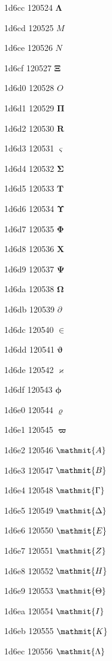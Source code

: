 \documentclass[11pt]{article}
\begin{document}
1d6cc 120524 \ensuremath{\mathbf{\Lambda}}

1d6cd 120525 \ensuremath{M}

1d6ce 120526 \ensuremath{N}

1d6cf 120527 \ensuremath{\mathbf{\Xi}}

1d6d0 120528 \ensuremath{O}

1d6d1 120529 \ensuremath{\mathbf{\Pi}}

1d6d2 120530 \ensuremath{\mathbf{{R}}}

1d6d3 120531 \ensuremath{\mathbf{\varsigma}}

1d6d4 120532 \ensuremath{\mathbf{\Sigma}}

1d6d5 120533 \ensuremath{\mathbf{{T}}}

1d6d6 120534 \ensuremath{\mathbf{\Upsilon}}

1d6d7 120535 \ensuremath{\mathbf{\Phi}}

1d6d8 120536 \ensuremath{\mathbf{{X}}}

1d6d9 120537 \ensuremath{\mathbf{\Psi}}

1d6da 120538 \ensuremath{\mathbf{\Omega}}

1d6db 120539 \ensuremath{\partial}

1d6dc 120540 \ensuremath{\in}

1d6dd 120541 \ensuremath{\mathbf{\vartheta}}

1d6de 120542 \ensuremath{\mathbf{\varkappa}}

1d6df 120543 \ensuremath{\mathbf{\phi}}

1d6e0 120544 \ensuremath{\mathbf{\varrho}}

1d6e1 120545 \ensuremath{\mathbf{\varpi}}

1d6e2 120546 \ensuremath{\mathmit{{A}}}

1d6e3 120547 \ensuremath{\mathmit{{B}}}

1d6e4 120548 \ensuremath{\mathmit{\Gamma}}

1d6e5 120549 \ensuremath{\mathmit{\Delta}}

1d6e6 120550 \ensuremath{\mathmit{{E}}}

1d6e7 120551 \ensuremath{\mathmit{{Z}}}

1d6e8 120552 \ensuremath{\mathmit{{H}}}

1d6e9 120553 \ensuremath{\mathmit{\Theta}}

1d6ea 120554 \ensuremath{\mathmit{{I}}}

1d6eb 120555 \ensuremath{\mathmit{{K}}}

1d6ec 120556 \ensuremath{\mathmit{\Lambda}}
\end{document}

